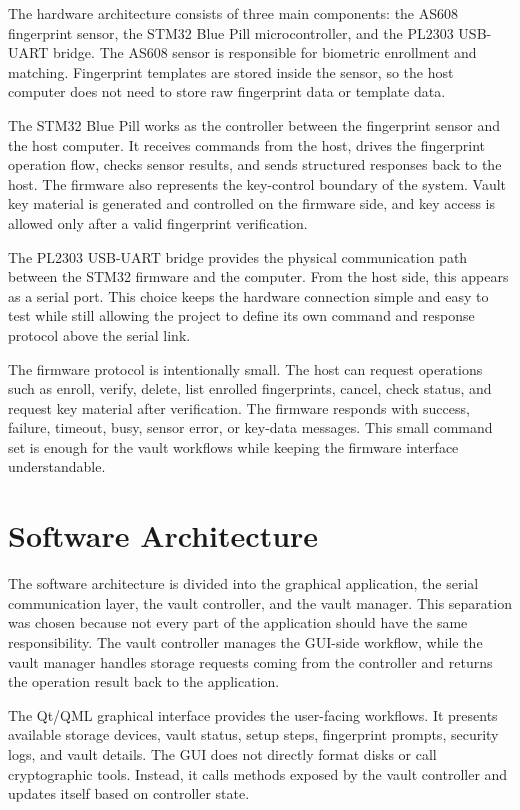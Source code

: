 The hardware architecture consists of three main components: the AS608 fingerprint sensor, the STM32 Blue Pill microcontroller, and the PL2303 USB-UART bridge. The AS608 sensor is responsible for biometric enrollment and matching. Fingerprint templates are stored inside the sensor, so the host computer does not need to store raw fingerprint data or template data.

The STM32 Blue Pill works as the controller between the fingerprint sensor and the host computer. It receives commands from the host, drives the fingerprint operation flow, checks sensor results, and sends structured responses back to the host. The firmware also represents the key-control boundary of the system. Vault key material is generated and controlled on the firmware side, and key access is allowed only after a valid fingerprint verification.

The PL2303 USB-UART bridge provides the physical communication path between the STM32 firmware and the computer. From the host side, this appears as a serial port. This choice keeps the hardware connection simple and easy to test while still allowing the project to define its own command and response protocol above the serial link.

The firmware protocol is intentionally small. The host can request operations such as enroll, verify, delete, list enrolled fingerprints, cancel, check status, and request key material after verification. The firmware responds with success, failure, timeout, busy, sensor error, or key-data messages. This small command set is enough for the vault workflows while keeping the firmware interface understandable.

\section{Software Architecture}

The software architecture is divided into the graphical application, the serial communication layer, the vault controller, and the vault manager. This separation was chosen because not every part of the application should have the same responsibility. The vault controller manages the GUI-side workflow, while the vault manager handles storage requests coming from the controller and returns the operation result back to the application.

The Qt/QML graphical interface provides the user-facing workflows. It presents available storage devices, vault status, setup steps, fingerprint prompts, security logs, and vault details. The GUI does not directly format disks or call cryptographic tools. Instead, it calls methods exposed by the vault controller and updates itself based on controller state.

